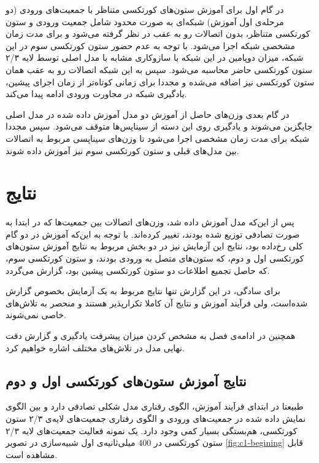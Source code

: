 \documentclass[12pt]{report}
\begin{document}
	در گام اول برای آموزش ستون‌های کورتکسی متناظر با جمعیت‌های ورودی (دو مرحله‌ی اول آموزش) شبکه‌ای به صورت محدود شامل جمعیت ورودی و ستون کورتکسی متناظر، بدون اتصالات رو به عقب در نظر گرفته می‌شود و برای مدت زمان مشخصی شبکه اجرا می‌شود. با توجه به عدم حضور ستون کورتکسی سوم در این شبکه، میزان دوپامین در این شبکه با سازوکاری مشابه با مدل اصلی توسط لایه ۲/۳ ستون کورتکسی حاضر محاسبه می‌شود. سپس به این شبکه اتصالات رو به عقب همان ستون کورتکسی نیز اضافه می‌شده و مجددا برای زمانی کوتاه‌تر از زمان اجرای پیشین، یادگیری شبکه در مجاورت ورودی ادامه پیدا می‌کند.
	
	در گام بعدی وزن‌های حاصل از آموزش دو مدل آموزش داده شده در مدل اصلی جایگزین می‌شوند و یادگیری روی این دسته از سیناپس‌ها متوقف می‌شود. سپس مجددا شبکه برای مدت زمان مشخصی اجرا می‌شود تا وزن‌های سیناپسی مربوط به اتصالات بین مدل‌های قبلی و ستون کورتکسی سوم نیز آموزش داده شوند.
	

	\section{نتایج}
	پس از این‌که مدل آموزش داده‌ شد، وزن‌های اتصالات بین جمعیت‌ها که در ابتدا به صورت تصادفی توزیع شده بودند، تغییر کرده‌اند. با توجه به این‌که آموزش در دو گام کلی رخ‌داده بود، نتایج این آزمایش نیز در دو بخش مربوط به نتایج آموزش ستون‌های کورتکسی اول و دوم، که ستون‌های متصل به ورودی بودند، و ستون کورتکسی سوم، که حاصل تجمیع اطلاعات دو ستون کورتکسی پیشین بود، گزارش می‌گردد.
	
	برای سادگی، در این گزارش تنها نتایج مربوط به یک آزمایش بخصوص گزارش شده‌است، ولی فرآیند آموزش و نتایج آن کاملا تکرار‌پذیر هستند و منحصر به تلاش‌های خاصی نمی‌شوند.
	
	همچنین در ادامه‌ی فصل به مشخص کردن میزان پیشرفت یادگیری و  گزارش دقت نهایی مدل در تلاش‌ها‌ی مختلف اشاره خواهیم کرد.
	
	\subsection{نتایج آموزش ستون‌های کورتکسی اول و دوم}
	طبیعتا در ابتدای فرآیند آموزش، الگوی رفتاری مدل شکلی تصادفی دارد و بین الگوی نمایش داده شده در جمعیت‌های ورودی و الگوی رفتاری جمعیت‌های لایه‌ی ۲/۳ ستون کورتکسی، هم‌بستگی بسیار کمی وجود دارد. یک نمونه فعالیت جمعیت‌های لایه‌ ۲/۳ ستون کورتکسی در 400 میلی‌ثانیه‌ی اول شبیه‌سازی در تصویر ‌\ref{fig:c1-begining} قابل مشاهده است.
	
\end{document}
